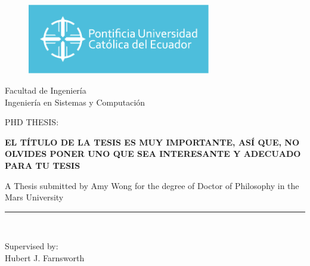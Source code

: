 \documentclass[a4paper,openright,12pt]{book}
\begin{document}
	\begin{titlepage}
		\begin{center}
			\vspace*{-1in}
			\begin{figure}[htb]
				\begin{center}
					\includegraphics[width=8cm]{./logos/puce.jpg}
				\end{center}
			\end{figure}
			Facultad de Ingeniería\\
			\vspace*{0.15in}
			Ingeniería en Sistemas y Computación\\
			\vspace*{0.6in}
			\begin{large}
				PHD THESIS:\\
			\end{large}
			\vspace*{0.2in}
			\begin{Large}
				\textbf{EL TÍTULO DE LA TESIS ES MUY IMPORTANTE, ASÍ QUE, NO OLVIDES PONER UNO QUE SEA INTERESANTE Y ADECUADO PARA TU TESIS} \\
			\end{Large}
			\vspace*{0.3in}
			\begin{large}
				A Thesis submitted by Amy Wong for the degree of Doctor of Philosophy in the Mars University\\
			\end{large}
			\vspace*{0.3in}
			\rule{80mm}{0.1mm}\\
			\vspace*{0.1in}
			\begin{large}
				Supervised by: \\
				Hubert J. Farnsworth \\
			\end{large}
		\end{center}
	\end{titlepage}
\end{document}
